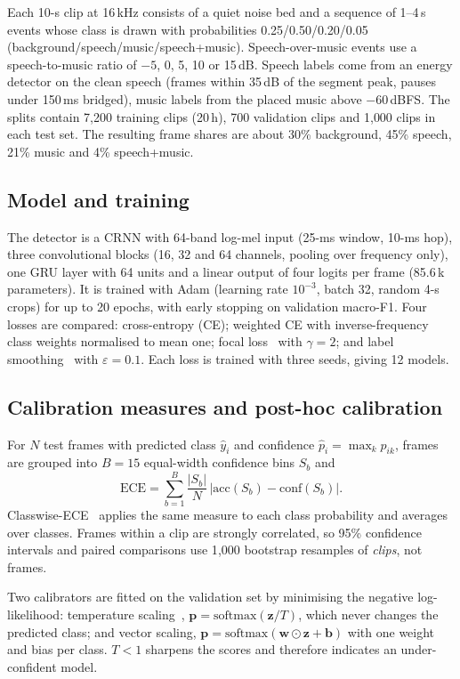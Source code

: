 \documentclass[conference]{IEEEtran}
\newcommand{\spmu}{speech+music}
\begin{document}
Each 10-s clip at 16\,kHz consists of a quiet noise bed and a sequence of 1--4\,s events whose class is drawn with probabilities 0.25/0.50/0.20/0.05 (background/speech/music/\spmu). Speech-over-music events use a speech-to-music ratio of $-5$, 0, 5, 10 or 15\,dB. Speech labels come from an energy detector on the clean speech (frames within 35\,dB of the segment peak, pauses under 150\,ms bridged), music labels from the placed music above $-60$\,dBFS. The splits contain 7{,}200 training clips (20\,h), 700 validation clips and 1{,}000 clips in each test set. The resulting frame shares are about 30\% background, 45\% speech, 21\% music and 4\% \spmu.

\subsection{Model and training}
The detector is a CRNN with 64-band log-mel input (25-ms window, 10-ms hop), three convolutional blocks (16, 32 and 64 channels, pooling over frequency only), one GRU layer with 64 units and a linear output of four logits per frame (85.6\,k parameters). It is trained with Adam (learning rate $10^{-3}$, batch 32, random 4-s crops) for up to 20 epochs, with early stopping on validation macro-F1. Four losses are compared: cross-entropy (CE); weighted CE with inverse-frequency class weights normalised to mean one; focal loss~\cite{lin2017focal} with $\gamma=2$; and label smoothing~\cite{muller2019labelsmoothing} with $\varepsilon=0.1$. Each loss is trained with three seeds, giving 12 models.

\subsection{Calibration measures and post-hoc calibration}
For $N$ test frames with predicted class $\hat{y}_i$ and confidence $\hat{p}_i=\max_k p_{ik}$, frames are grouped into $B=15$ equal-width confidence bins $S_b$ and
\begin{equation}
\mathrm{ECE}=\sum_{b=1}^{B}\frac{|S_b|}{N}\,\bigl|\mathrm{acc}(S_b)-\mathrm{conf}(S_b)\bigr| .
\end{equation}
Classwise-ECE~\cite{kull2019dirichlet} applies the same measure to each class probability and averages over classes. Frames within a clip are strongly correlated, so 95\% confidence intervals and paired comparisons use 1{,}000 bootstrap resamples of \emph{clips}, not frames.

Two calibrators are fitted on the validation set by minimising the negative log-likelihood: temperature scaling~\cite{guo2017calibration}, $\mathbf{p}=\mathrm{softmax}(\mathbf{z}/T)$, which never changes the predicted class; and vector scaling, $\mathbf{p}=\mathrm{softmax}(\mathbf{w}\odot\mathbf{z}+\mathbf{b})$ with one weight and bias per class. $T<1$ sharpens the scores and therefore indicates an under-confident model.
\end{document}
